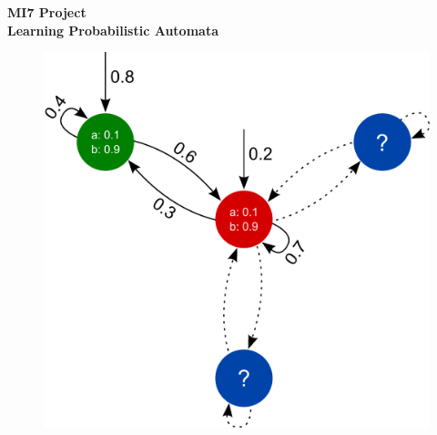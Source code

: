 \begin{titlepage}
	\begin{center}
		\textup{\small {\bf MI7 Project}}\\[0.2in]	
		\Large \textbf {Learning Probabilistic Automata}\\[0.5in]
		
		\begin{figure}[!h]
			\centering
			\includegraphics[width=1\linewidth]{pictures/frontpagemodel.pdf}
			\label{fig:Frontpage}
		\end{figure}
	\end{center}
\end{titlepage}

